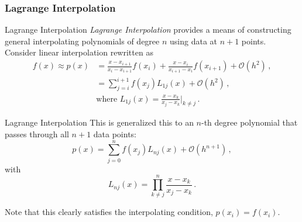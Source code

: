 \documentclass[11pt]{beamer}
\begin{document}
\subsubsection{Lagrange Interpolation}
\begin{frame}[fragile]{Lagrange Interpolation}
\emph{Lagrange Interpolation} provides a means of constructing
general interpolating polynomials of degree $n$ using data at $n+1$
points.\\

\pause
Consider linear interpolation rewritten as
\begin{equation}
\begin{aligned}
f(x) \approx p(x) & = \frac{x-x_{i+1}}{x_i - x_{i+1}} f(x_i) +
\frac{x-x_i}{x_{i+1}-x_i} f(x_{i+1}) + \mathcal{O}(h^2)\,,\\
  & = \sum_{j=i}^{i+1} f(x_j) L_{1j}(x) + \mathcal{O}(h^2)\,,\\
& \text{where}\,\, L_{1j}(x) = \frac{x-x_k}{x_j-x_k}\bigg|_{k\ne j}\,.
\end{aligned}
\end{equation}
\end{frame}

\begin{frame}[fragile]{Lagrange Interpolation}
This is generalized this to an $n$-th degree polynomial that
passes through all $n+1$ data points:
\begin{equation}
p(x) = \sum_{j=0}^{n} f(x_j) L_{nj}(x) + \mathcal{O}(h^{n+1})\,,
\end{equation}
with
\begin{equation}
L_{nj}(x) = \prod_{k\ne j}^{n} \frac{x-x_k}{x_j - x_k}\,.
\end{equation}

Note that this clearly satisfies the interpolating condition,
$p(x_i) = f(x_i)$.

\end{frame}
\end{document}
